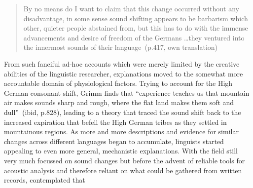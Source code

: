 
\begin{quote}
By no means do I want to claim that this change occurred without any disadvantage, in some sense sound shifting appears to be barbarism which other, quieter people abstained from, but this has to do with the immense advancements and desire of freedom of the Germans \ldots they ventured into the innermost sounds of their language~(p.417, own translation)
\end{quote}

From such fanciful ad-hoc accounts which were merely limited by the creative abilities of the linguistic researcher,
explanations moved to the somewhat more accountable domain of physiological factors. Trying to account for the High German consonant shift, Grimm finds that ``experience teaches us that mountain air makes sounds sharp and rough, where the flat land makes them soft and dull''~(ibid, p.828), leading to a theory that traced the sound shift back to the increased expiration that befell the High German tribes as they settled in mountainous regions. As more and more descriptions and evidence for similar changes across different languages began to accumulate, linguists started appealing to even more general, mechanistic explanations.
With the field still very much focussed on sound changes but before the advent of reliable tools for acoustic analysis and therefore reliant on what could be gathered from written records, \citet{Jespersen1922} contemplated that

